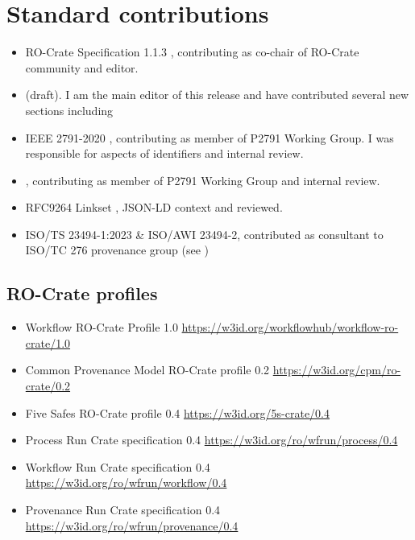 \section{Standard contributions}
\begin{itemize}
  \item RO-Crate Specification 1.1.3 \cite{rocrate1.1}, contributing as co-chair of RO-Crate community and editor.
  \item {} (draft). I am the main editor of this release and have contributed several new sections including 
  \item IEEE 2791-2020 \cite{ieee2791}, contributing as member of P2791 Working Group. I was responsible for aspects of identifiers and internal review.
  \item {}, contributing as member of P2791 Working Group and internal review.
  \item RFC9264 Linkset \cite{RFC9264},  JSON-LD context and reviewed.
  \item ISO/TS 23494-1:2023 \& ISO/AWI 23494-2, contributed as consultant to ISO/TC 276 provenance group (see \cite{Wittner 2020,Wittner 2023,Wittner 2023b})
\end{itemize}

\subsection{RO-Crate profiles}

\begin{itemize}
  \item Workflow RO-Crate Profile 1.0 \cite{Bacall 2022} \url{https://w3id.org/workflowhub/workflow-ro-crate/1.0}
  \item Common Provenance Model RO-Crate profile 0.2 \url{https://w3id.org/cpm/ro-crate/0.2}
  \item Five Safes RO-Crate profile 0.4 \cite{5s-crate} \url{https://w3id.org/5s-crate/0.4}
  \item Process Run Crate specification 0.4 \cite{WRROC 2023a} \url{https://w3id.org/ro/wfrun/process/0.4}
  \item Workflow Run Crate specification 0.4 \cite{WRROC 2023b} \url{https://w3id.org/ro/wfrun/workflow/0.4}
  \item Provenance Run Crate specification 0.4 \cite{WRROC 2023c} \url{https://w3id.org/ro/wfrun/provenance/0.4}  
\end{itemize}


